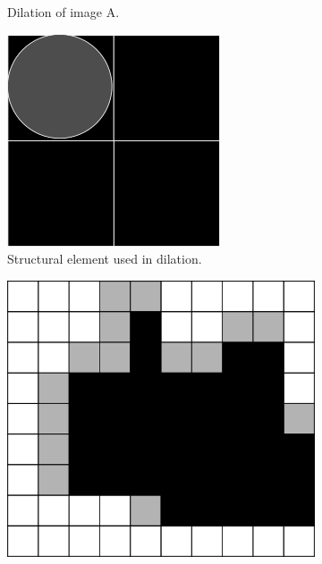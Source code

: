 \documentclass[
  digital,     %
  oneside,     %
  nosansbold,  %
  nocolorbold, %
  lof,         %
  lot,         %
]{fithesis4}
\begin{document}
\begin{figure}
\begin{subfigure}[t]{0.4\textwidth}
        \caption{Dilation of image A.}
        \label{fig:opening_erosion}
    \end{subfigure}
    \begin{subfigure}[t]{0.2\textwidth}
        \centering
        \includegraphics[width=\textwidth]{resources/inkscape/opening_erosion_se.png}
        \caption{Structural element used in dilation.}
        \label{fig:opening_erosion_se}
    \end{subfigure}
    \begin{subfigure}[t]{0.4\textwidth}
        \centering
        \includegraphics[width=\textwidth]{resources/inkscape/closing_erosion.png}

\end{subfigure}
\end{figure}
\end{document}
